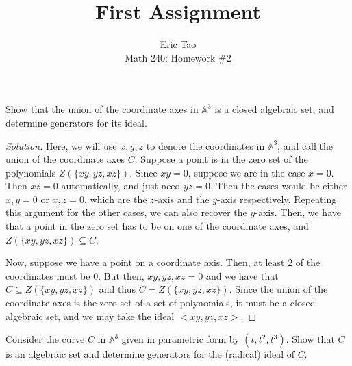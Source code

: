 \documentclass[10pt]{article}
\newenvironment{problem}[2][Problem]{\begin{trivlist}
\item[\hskip \labelsep {\bfseries #1}\hskip \labelsep {\bfseries #2.}]}{\end{trivlist}}
\begin{document}
 
\title{First Assignment}
\author{Eric Tao\\
Math 240: Homework \#2}
\maketitle
 
\begin{problem}{2.1}

Show that the union of the coordinate axes in $\mathbb{A}^3$ is a closed algebraic set, and determine generators for its ideal.

\end{problem}

\begin{proof}[Solution]

Here, we will use $x,y,z$ to denote the coordinates in $\mathbb{A}^3$, and call the union of the coordinate axes $C$. Suppose a point is in the zero set of the polynomials $Z(\{xy,yz,xz\})$. Since $xy = 0$, suppose we are in the case $x = 0$. Then $xz = 0$ automatically, and just need $yz = 0$. Then the cases would be either $x,y = 0$ or $x,z = 0$, which are the $z$-axis and the $y$-axis respectively. Repeating this argument for the other cases, we can also recover the $y$-axis. Then, we have that a point in the zero set has to be on one of the coordinate axes, and $Z(\{xy,yz,xz\}) \subseteq C$.

Now, suppose we have a point on a coordinate axis. Then, at least 2 of the coordinates must be 0. But then, $xy,yz,xz = 0$ and we have that $C \subseteq Z(\{xy,yz,xz\})$ and thus $C = Z(\{xy,yz,xz\})$. Since the union of the coordinate axes is the zero set of a set of polynomials, it must be a closed algebraic set, and we may take the ideal $<xy,yz,xz>$.

\end{proof}

\begin{problem}{2.2}

Consider the curve $C$ in $\mathbb{A}^3$ given in parametric form by $(t,t^2,t^3)$. Show that $C$ is an algebraic set and determine generators for the (radical) ideal of $C$.

\end{problem}
\end{document}

